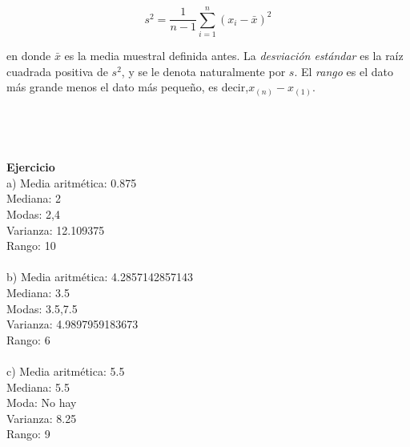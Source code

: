 \documentclass{report}
\begin{document}
\begin{equation*}
s^2 = \frac{1}{n - 1}\sum_{i=1}^{n}(x_i - \bar{x})^2
\end{equation*}

en donde $\bar{x}$ es la media muestral definida antes. La \textit{desviación estándar} es
la raíz cuadrada positiva de $s^2$, y se le denota naturalmente por $s$. El \textit{rango} es
el dato más grande menos el dato más pequeño, es decir,$x_{(n)} - x_{(1)}$.\\\\\\\\\\

\textbf{Ejercicio}\\

a) Media aritmética: 0.875\\
Mediana: 2\\
Modas: 2,4\\
Varianza: 12.109375\\
Rango: 10\\\\


b) Media aritmética: 4.2857142857143\\
Mediana: 3.5\\
Modas: 3.5,7.5\\
Varianza: 4.9897959183673\\
Rango: 6\\\\

c) Media aritmética: 5.5\\
Mediana: 5.5\\
Moda: No hay\\
Varianza: 8.25\\
Rango: 9\\
\end{document}
